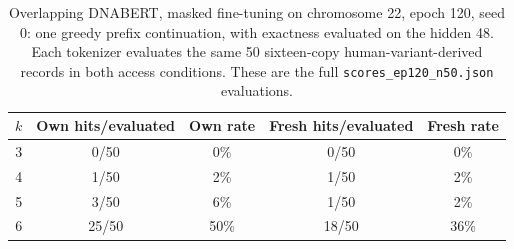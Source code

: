 \begin{table}[tbp]
\centering
\caption{Overlapping DNABERT, masked fine-tuning on chromosome 22, epoch 120,
seed 0: one greedy prefix continuation, with exactness evaluated on the hidden 48\nt{}.
Each tokenizer evaluates the same 50 sixteen-copy human-variant-derived records in both
access conditions. These are the full \texttt{scores\_ep120\_n50.json} evaluations.}
\label{tab:overlap50}
\begin{tabular}{ccccc}
\toprule
$k$ & Own hits/evaluated & Own rate & Fresh hits/evaluated & Fresh rate \\
\midrule
3 & 0/50 & 0\% & 0/50 & 0\% \\
4 & 1/50 & 2\% & 1/50 & 2\% \\
5 & 3/50 & 6\% & 1/50 & 2\% \\
6 & 25/50 & 50\% & 18/50 & 36\% \\
\bottomrule
\end{tabular}
\end{table}
